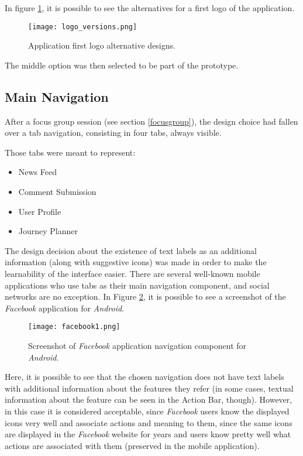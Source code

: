 In figure \ref{fig:logo}, it is possible to see the alternatives for a first logo of the application. 

\begin{figure}[htb]
  \begin{center}
    \leavevmode
    \texttt{[image: logo\_versions.png]}
    \caption{Application first logo alternative designs.}
    \label{fig:logo}
  \end{center}
\end{figure}

The middle option was then selected to be part of the prototype.


\subsection{Main Navigation}

After a focus group session (see section \ref{focusgroup}), the design choice had fallen over a tab navigation, consisting in four tabs, always visible.

Those tabs were meant to represent:

\begin{itemize}
\item News Feed
\item Comment Submission
\item User Profile
\item Journey Planner
\end{itemize}

The design decision about the existence of text labels as an additional information (along with suggestive icons) was made in order to make the learnability of the interface easier. There are several well-known mobile applications who use tabs as their main navigation component, and social networks are no exception. In Figure \ref{fig:facebook1}, it is possible to see a screenshot of the \emph{Facebook} application for \emph{Android}. 

\begin{figure}[htb]
  \begin{center}
    \leavevmode
    \texttt{[image: facebook1.png]}
    \caption{Screenshot of \emph{Facebook} application navigation component for \emph{Android}.}
    \label{fig:facebook1}
  \end{center}
\end{figure}

Here, it is possible to see that the chosen navigation does not have text labels with additional information about the features they refer (in some cases, textual information about the feature can be seen in the Action Bar, though). However, in this case it is considered acceptable, since \emph{Facebook} users know the displayed icons very well and associate actions and meaning to them, since the same icons are displayed in the \emph{Facebook} website for years and users know pretty well what actions are associated with them (preserved in the mobile application).


